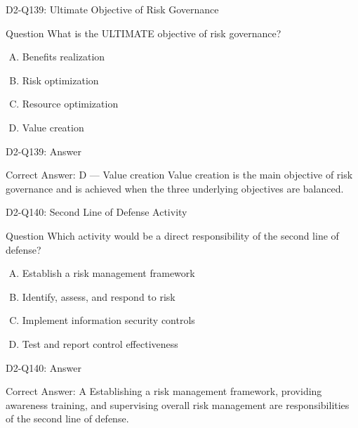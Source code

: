 \documentclass{beamer}
\begin{document}
	\begin{frame}{D2-Q139: Ultimate Objective of Risk Governance}
		\begin{block}{Question}
			What is the ULTIMATE objective of risk governance?
		\end{block}
		\begin{enumerate}[(A)]
			\item Benefits realization
			\item Risk optimization
			\item Resource optimization
			\item Value creation
		\end{enumerate}
	\end{frame}
	\begin{frame}{D2-Q139: Answer}
		\begin{block}{Correct Answer: D --- Value creation}
			Value creation is the main objective of risk governance and is achieved when the three underlying objectives are balanced.
		\end{block}
	\end{frame}
	
	\begin{frame}{D2-Q140: Second Line of Defense Activity}
		\begin{block}{Question}
			Which activity would be a direct responsibility of the second line of defense?
		\end{block}
		\begin{enumerate}[(A)]
			\item Establish a risk management framework
			\item Identify, assess, and respond to risk
			\item Implement information security controls
			\item Test and report control effectiveness
		\end{enumerate}
	\end{frame}
	\begin{frame}{D2-Q140: Answer}
		\begin{block}{Correct Answer: A}
			Establishing a risk management framework, providing awareness training, and supervising overall risk management are responsibilities of the second line of defense.
		\end{block}
	\end{frame}
	
\end{document}
